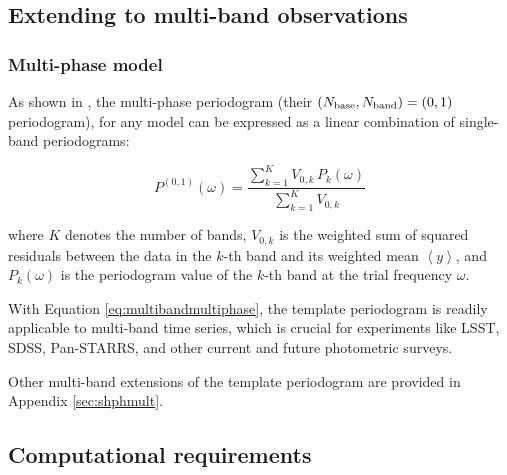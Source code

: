 \documentclass[apj]{emulateapj}
\newcommand{\savg}[1]{\left<#1\right>}
\begin{document}
\subsection{Extending to multi-band observations}

\subsubsection{Multi-phase model}
\label{sec:multiband}
As shown in \cite{Vanderplas+Ivezic_2015}, the multi-phase periodogram (their
$(N_{\rm base}, N_{\rm band}) = (0, 1)$ periodogram), for any model can
be expressed as a linear combination of single-band periodograms:

\begin{equation}
\label{eq:multibandmultiphase}
P^{(0,1)}(\omega) = \frac{\sum_{k=1}^K V_{0, k}\,P_{k}(\omega)}{\sum_{k=1}^K V_{0,k}}
\end{equation}

\noindent where $K$ denotes the number of bands, $V_{0,k}$ is the weighted sum of squared
residuals between the data in the $k$-th band and its weighted mean $\savg{y}$, and $P_k(\omega)$ is
the periodogram value of the $k$-th band at the trial frequency $\omega$.

With Equation \ref{eq:multibandmultiphase}, the template periodogram is readily applicable to multi-band
time series, which is crucial for experiments like LSST, SDSS, Pan-STARRS, and other current
and future photometric surveys.

Other multi-band extensions of the template periodogram are provided in Appendix \ref{sec:shphmult}.

\subsection{Computational requirements}\label{sec:compreqs}
\end{document}
